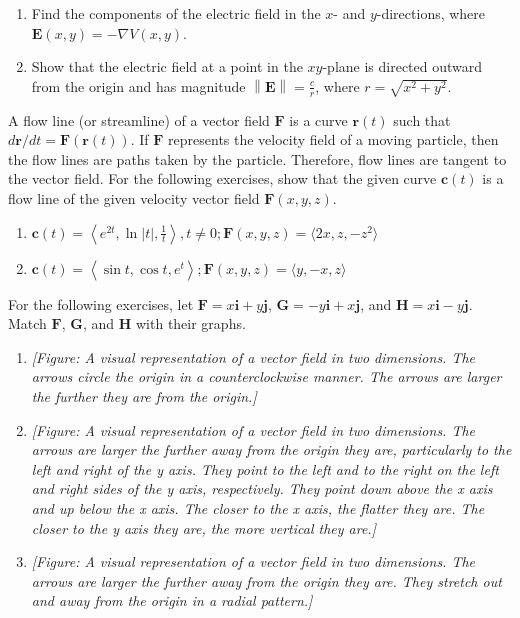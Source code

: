 \documentclass{exercises}
\begin{document}
\begin{enumerate}[resume]
\item Find the components of the electric field in the $x$- and $y$-directions, where $\mathbf{E}(x,y)=-\nabla V(x,y)$.
\item Show that the electric field at a point in the $xy$-plane is directed outward from the origin and has magnitude $\left\| \mathbf{E} \right\|=\frac{c}{r}$, where $r=\sqrt{x^{2}+y^{2}}$.
\end{enumerate}

A flow line (or streamline) of a vector field $\mathbf{F}$ is a curve $\mathbf{r}(t)$ such that $d\mathbf{r}/dt=\mathbf{F}(\mathbf{r}(t))$. If $\mathbf{F}$ represents the velocity field of a moving particle, then the flow lines are paths taken by the particle. Therefore, flow lines are tangent to the vector field. For the following exercises, show that the given curve $\mathbf{c}(t)$ is a flow line of the given velocity vector field $\mathbf{F}(x,y,z)$.

\begin{enumerate}[resume]
\item $\mathbf{c}(t)=\left\langle e^{2t},\ln|t|,\frac{1}{t} \right\rangle,t\ne0;\mathbf{F}(x,y,z)=\langle2x,z,-z^{2}\rangle$
\item $\mathbf{c}(t)=\left\langle \sin t,\cos t,e^{t} \right\rangle;\mathbf{F}(x,y,z)=\langle y,-x,z\rangle$
\end{enumerate}

For the following exercises, let $\mathbf{F}=x\mathbf{i}+y\mathbf{j}$, $\mathbf{G}=-y\mathbf{i}+x\mathbf{j}$, and $\mathbf{H}=x\mathbf{i}-y\mathbf{j}$. Match $\mathbf{F}$, $\mathbf{G}$, and $\mathbf{H}$ with their graphs.

\begin{enumerate}[resume]
\item \textit{[Figure: A visual representation of a vector field in two dimensions. The arrows circle the origin in a counterclockwise manner. The arrows are larger the further they are from the origin.]}
\item \textit{[Figure: A visual representation of a vector field in two dimensions. The arrows are larger the further away from the origin they are, particularly to the left and right of the y axis. They point to the left and to the right on the left and right sides of the y axis, respectively. They point down above the x axis and up below the x axis. The closer to the x axis, the flatter they are. The closer to the y axis they are, the more vertical they are.]}
\item \textit{[Figure: A visual representation of a vector field in two dimensions. The arrows are larger the further away from the origin they are. They stretch out and away from the origin in a radial pattern.]}
\end{enumerate}
\end{document}
